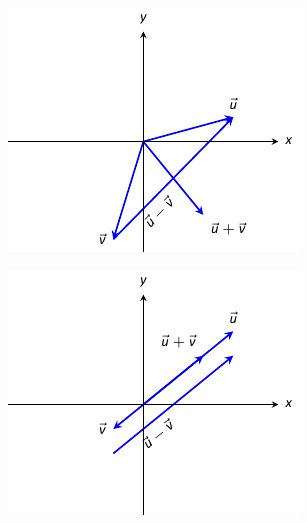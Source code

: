 \begin{Answer}
\Question
\begin{minipage}[m]{\linewidth}
\centering
\includegraphics[width=\linewidth/2]{vector_geometry/introduction_to_vectors/figures/fig10_02_ex_11ans}
\end{minipage}
\Question
\begin{minipage}[m]{\linewidth}
\centering
\includegraphics[width=\linewidth/2]{vector_geometry/introduction_to_vectors/figures/fig10_02_ex_13ans}
\end{minipage}

\end{Answer}
